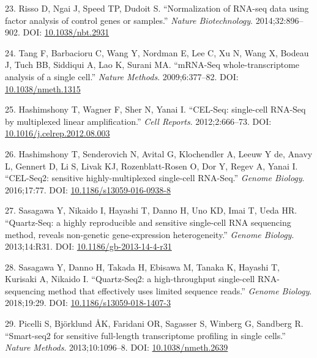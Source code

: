 \documentclass[11pt,a4paper,titlepage,twoside,openright]{style/unimelbthesis}
\theoremstyle{definition}
\theoremstyle{definition}
\theoremstyle{definition}
\theoremstyle{remark}
\begin{document}
\begin{mainmatter}
\leavevmode\hypertarget{ref-Risso2014-zw}{}%
23. Risso D, Ngai J, Speed TP, Dudoit S. ``Normalization of RNA-seq data using factor analysis of control genes or samples.'' \emph{Nature Biotechnology}. 2014;32:896--902. DOI: \href{https://doi.org/10.1038/nbt.2931}{10.1038/nbt.2931}

\leavevmode\hypertarget{ref-Tang2009-jd}{}%
24. Tang F, Barbacioru C, Wang Y, Nordman E, Lee C, Xu N, Wang X, Bodeau J, Tuch BB, Siddiqui A, Lao K, Surani MA. ``mRNA-Seq whole-transcriptome analysis of a single cell.'' \emph{Nature Methods}. 2009;6:377--82. DOI: \href{https://doi.org/10.1038/nmeth.1315}{10.1038/nmeth.1315}

\leavevmode\hypertarget{ref-Hashimshony2012-dh}{}%
25. Hashimshony T, Wagner F, Sher N, Yanai I. ``CEL-Seq: single-cell RNA-Seq by multiplexed linear amplification.'' \emph{Cell Reports}. 2012;2:666--73. DOI: \href{https://doi.org/10.1016/j.celrep.2012.08.003}{10.1016/j.celrep.2012.08.003}

\leavevmode\hypertarget{ref-Hashimshony2016-yi}{}%
26. Hashimshony T, Senderovich N, Avital G, Klochendler A, Leeuw Y de, Anavy L, Gennert D, Li S, Livak KJ, Rozenblatt-Rosen O, Dor Y, Regev A, Yanai I. ``CEL-Seq2: sensitive highly-multiplexed single-cell RNA-Seq.'' \emph{Genome Biology}. 2016;17:77. DOI: \href{https://doi.org/10.1186/s13059-016-0938-8}{10.1186/s13059-016-0938-8}

\leavevmode\hypertarget{ref-Sasagawa2013-uc}{}%
27. Sasagawa Y, Nikaido I, Hayashi T, Danno H, Uno KD, Imai T, Ueda HR. ``Quartz-Seq: a highly reproducible and sensitive single-cell RNA sequencing method, reveals non-genetic gene-expression heterogeneity.'' \emph{Genome Biology}. 2013;14:R31. DOI: \href{https://doi.org/10.1186/gb-2013-14-4-r31}{10.1186/gb-2013-14-4-r31}

\leavevmode\hypertarget{ref-Sasagawa2018-ox}{}%
28. Sasagawa Y, Danno H, Takada H, Ebisawa M, Tanaka K, Hayashi T, Kurisaki A, Nikaido I. ``Quartz-Seq2: a high-throughput single-cell RNA-sequencing method that effectively uses limited sequence reads.'' \emph{Genome Biology}. 2018;19:29. DOI: \href{https://doi.org/10.1186/s13059-018-1407-3}{10.1186/s13059-018-1407-3}

\leavevmode\hypertarget{ref-Picelli2013-or}{}%
29. Picelli S, Björklund ÅK, Faridani OR, Sagasser S, Winberg G, Sandberg R. ``Smart-seq2 for sensitive full-length transcriptome profiling in single cells.'' \emph{Nature Methods}. 2013;10:1096--8. DOI: \href{https://doi.org/10.1038/nmeth.2639}{10.1038/nmeth.2639}


\end{mainmatter}
\end{document}
